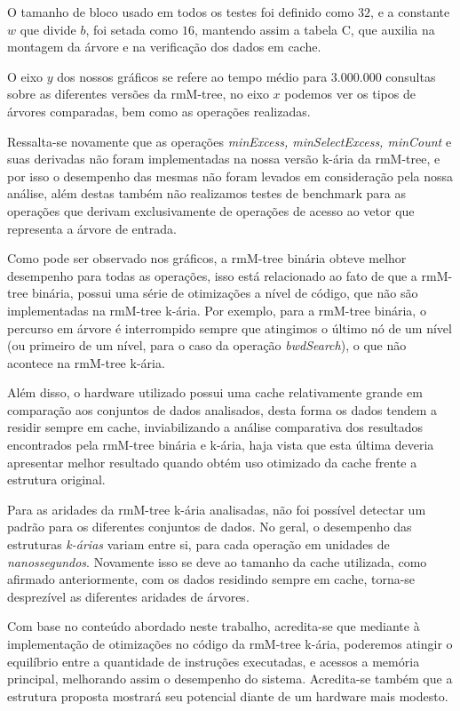  O tamanho de bloco usado em todos os testes foi definido como $32$, e a constante $w$ que divide $b$, foi setada como $16$, mantendo assim a tabela C, que auxilia na montagem da árvore e na verificação dos dados em cache.

O eixo $y$ dos nossos gráficos se refere ao tempo médio para $3.000.000$ consultas sobre as diferentes versões da rmM-tree, no eixo $x$ podemos ver os tipos de árvores comparadas, bem como as operações realizadas. 

Ressalta-se novamente que as operações \textit{minExcess, minSelectExcess, minCount} e suas derivadas não foram implementadas na nossa versão k-ária da rmM-tree, e por isso o desempenho das mesmas não foram levados em consideração pela nossa análise, além destas também não realizamos testes de benchmark para as operações que derivam exclusivamente de operações de acesso ao vetor que representa a árvore de entrada.

Como pode ser observado nos gráficos, a rmM-tree binária obteve melhor desempenho para todas as operações, isso está relacionado ao fato de que a rmM-tree binária, possui uma série de otimizações a nível de código, que não são implementadas na rmM-tree k-ária. Por exemplo, para a rmM-tree binária, o percurso em árvore é interrompido sempre que atingimos o último nó de um nível (ou primeiro de um nível, para o caso da operação \textit{bwdSearch}), o que não acontece na rmM-tree k-ária.

Além disso, o hardware utilizado possui uma cache relativamente grande em comparação aos conjuntos de dados analisados, desta forma os dados tendem a residir sempre em cache, inviabilizando a análise comparativa dos resultados encontrados pela rmM-tree binária e k-ária, haja vista que esta última deveria apresentar melhor resultado quando obtém uso otimizado da cache frente a estrutura original. 

Para as aridades da rmM-tree k-ária analisadas, não foi possível detectar um padrão para os diferentes conjuntos de dados. No geral, o desempenho das estruturas \textit{k-árias} variam entre si, para cada operação em unidades de \textit{nanossegundos}. Novamente isso se deve ao tamanho da cache utilizada, como afirmado anteriormente, com os dados residindo sempre em cache, torna-se desprezível as diferentes aridades de árvores. 

Com base no conteúdo abordado neste trabalho, acredita-se que mediante à implementação de otimizações no código da rmM-tree k-ária, poderemos atingir o equilíbrio entre a quantidade de instruções executadas, e acessos a memória principal, melhorando assim o desempenho do sistema. Acredita-se também que a estrutura proposta mostrará seu potencial diante de um hardware mais modesto.

